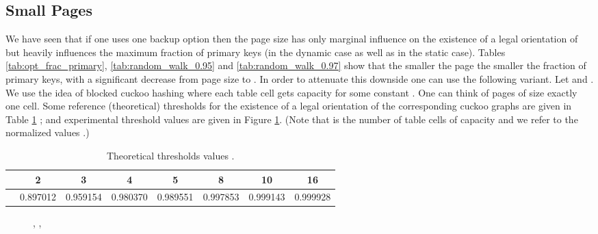 \let\accentvec\vec \documentclass{llncs}
\newcommand{\imgScale}{0.58}
\newcommand{\figPath}{.}
\begin{document}
\subsection{Small Pages}
We have seen that if one uses one backup option then the page size has only marginal influence on the existence of a legal orientation of  but heavily influences the maximum fraction of primary keys (in the dynamic case as well as in the static case). 
Tables \ref{tab:opt_frac_primary}, \ref{tab:random_walk_0.95} and \ref{tab:random_walk_0.97} show that the smaller the page the 
smaller the fraction of primary keys, with a significant decrease from page size  to .
In order to attenuate this downside one can use the following variant.
Let  and . We use the idea of blocked cuckoo hashing \cite{CainSW2007,dietzfelbinger2007balanced,FernholzR2007}
where each table cell gets capacity  for some constant . One can think of pages of size exactly one cell. Some reference (theoretical) thresholds  for the existence of a legal orientation of the corresponding cuckoo graphs are given in Table \ref{tab:2,l-ary} \cite{CainSW2007,FernholzR2007}; and experimental threshold values are given in Figure \ref{fig:2,l-ary}. (Note that  is the number of table cells of capacity  and we refer to the normalized values .)

\begin{table}[htb]
\centering
\begin{tabular}{c|ccccccc}
                    &  2        & 3        & 4        & 5        & 8        & 10       & 16    \\\hline
 &  0.897012 & 0.959154 & 0.980370 & 0.989551 & 0.997853 & 0.999143 & 0.999928
\end{tabular}
\vspace{0.2cm}
\caption{\label{tab:2,l-ary}Theoretical thresholds values .}
\end{table}






\begin{figure}
\subfigure[]{\scalebox{\imgScale}{}}
\subfigure[]{\scalebox{\imgScale}{}}
\caption{\label{fig:2,l-ary} , ,  }
\end{figure}
\end{document}
